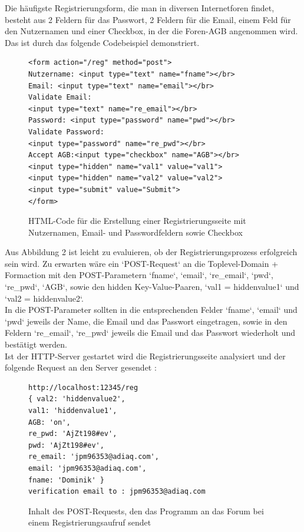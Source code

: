 Die häufigste Registrierungsform, die man in diversen Internetforen findet, besteht aus 2 Feldern für das Passwort, 2 Feldern für die Email, einem Feld für den Nutzernamen und einer Checkbox, in der die Foren-AGB angenommen wird. Das ist durch das folgende Codebeispiel demonstriert.


\begin{figure}[h!]
\begin{lstlisting}[language=HTML5]
<form action="/reg" method="post">
Nutzername: <input type="text" name="fname"></br>
Email: <input type="text" name="email"></br>
Validate Email: 
<input type="text" name="re_email"></br>
Password: <input type="password" name="pwd"></br>
Validate Password: 
<input type="password" name="re_pwd"></br>
Accept AGB:<input type="checkbox" name="AGB"></br>
<input type="hidden" name="val1" value="val1">
<input type="hidden" name="val2" value="val2">
<input type="submit" value="Submit">
</form>
\end{lstlisting}
\caption{HTML-Code für die Erstellung einer Registrierungsseite mit Nutzernamen, Email- und Passwordfeldern sowie Checkbox}
\end{figure}

Aus Abbildung 2 ist leicht zu evaluieren, ob der Registrierungsprozess erfolgreich sein wird. Zu erwarten wäre ein `POST-Request` an die Toplevel-Domain + Formaction mit den POST-Parametern `fname`, `email`, `re\_email`, `pwd`,\\ `re\_pwd`, `AGB`, sowie den hidden Key-Value-Paaren, `val1 = hiddenvalue1` und `val2 = hiddenvalue2`.\\
In die POST-Parameter sollten in die entsprechenden Felder `fname`, `email` und `pwd` jeweils der Name, die Email und das Passwort eingetragen, sowie in den Feldern `re\_email`, `re\_pwd` jeweils die Email und das Passwort wiederholt und bestätigt werden.\\
Ist der HTTP-Server gestartet wird die Registrierungsseite analysiert und der folgende Request an den Server gesendet :

\begin{figure}[ht]
\begin{lstlisting}[language=HTML5]
http://localhost:12345/reg
{ val2: 'hiddenvalue2',
val1: 'hiddenvalue1',
AGB: 'on',
re_pwd: 'AjZt198#ev',
pwd: 'AjZt198#ev',
re_email: 'jpm96353@adiaq.com',
email: 'jpm96353@adiaq.com',
fname: 'Dominik' }
verification email to : jpm96353@adiaq.com
\end{lstlisting}
\caption{Inhalt des POST-Requests, den das Programm an das Forum bei einem Registrierungsaufruf sendet}
\end{figure}

